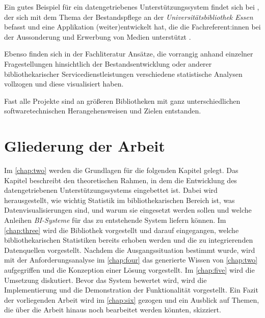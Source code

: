 Ein gutes Beispiel für ein datengetriebenes Unterstützungssystem findet sich bei , der sich mit dem Thema der Bestandspflege an der
\textit{Universitätsbibliothek Essen} befasst und eine Applikation (weiter)entwickelt hat, die
die Fachreferent:innen bei der Aussonderung und Erwerbung von Medien
unterstützt \cite[vgl.][S. 14 f.]{spielberg_eike_t_fachref-assistent_nodate}.


Ebenso finden sich in der Fachliteratur Ansätze, die vorrangig anhand einzelner
Fragestellungen hinsichtlich der Bestandsentwicklung \cite[vgl.][153]{hughes_long-term_2016} oder anderer
bibliothekarischer Servicedienstleistungen \cites[vgl.][]{kutlay_shiny_2020}[vgl.][S. 37 f.;]{knievel_use_2006}[vgl.][]{meyer_using_2018} verschiedene statistische Analysen
vollzogen und diese visualisiert haben.


Fast alle Projekte sind an größeren
Bibliotheken mit ganz unterschiedlichen softwaretechnischen
Herangehensweisen \cites[vgl.][]{wiegand_visualizing_2013}[vgl.][S. 768 f.]{finch_using_2016} und Zielen \cite[vgl.][96]{phetteplace_effectively_2012} entstanden.


\section{Gliederung der Arbeit}
Im \autoref{chap:two} werden die Grundlagen für die folgenden Kapitel gelegt. 
Das Kapitel beschreibt den theoretischen Rahmen, in dem die Entwicklung des datengetriebenen Unterstützungssystems eingebettet ist. Dabei wird herausgestellt, wie wichtig Statistik
im bibliothekarischen Bereich ist, was Datenvisualisierungen sind, und warum sie eingesetzt werden sollen und welche Anleihen \textit{\acrshort{BI}-Systeme} 
für das zu entstehende System liefern können. Im \autoref{chap:three}
wird die Bibliothek vorgestellt und darauf eingegangen, welche bibliothekarischen Statistiken bereits erhoben werden und die zu integrierenden Datenquellen vorgestellt.
Nachdem die Ausgangssituation bestimmt wurde, wird mit der Anforderungsanalyse  im \autoref{chap:four} das generierte Wissen von \autoref{chap:two}
aufgegriffen und die Konzeption einer Lösung vorgestellt.
Im \autoref{chap:five} wird die Umsetzung diskutiert. Bevor das System bewertet wird, wird die Implementierung und die Demonstration der Funktionalität vorgestellt.
Ein Fazit der vorliegenden Arbeit wird im \autoref{chap:six} gezogen und ein Ausblick auf Themen, die über die Arbeit hinaus noch bearbeitet werden könnten, skizziert.
